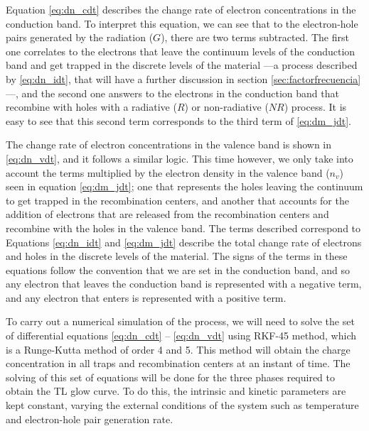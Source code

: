 Equation \ref{eq:dn_cdt} describes the change rate of electron concentrations in the conduction band. To interpret this equation, we can see that to the electron-hole pairs generated by the radiation ($G$), there are two terms subtracted. The first one correlates to the electrons that leave the continuum levels of the conduction band and get trapped in the discrete levels of the material ---a process described by \ref{eq:dn_idt}, that will have a further discussion in section \ref{sec:factorfrecuencia}---, and the second one answers to the electrons in the conduction band that recombine with holes with a radiative ($R$) or non-radiative ($N\!R$) process. It is easy to see that this second term corresponds to the third term of \ref{eq:dm_jdt}. 

\vspace{10pt}
The change rate of electron concentrations in the valence band is shown in \ref{eq:dn_vdt}, and it follows a similar logic. This time however, we only take into account the terms multiplied by the electron density in the valence band ($n_v$) seen in equation \ref{eq:dm_jdt}; one that represents the holes leaving the continuum to get trapped in the recombination centers, and another that accounts for the addition of electrons that are released from the recombination centers and recombine with the holes in the valence band. The terms described correspond to Equations \ref{eq:dn_idt} and \ref{eq:dm_jdt} describe the total change rate of electrons and holes in the discrete levels of the material. The signs of the terms in these equations follow the convention that we are set in the conduction band, and so any electron that leaves the conduction band is represented with a negative term, and any electron that enters is represented with a positive term.

\vspace{10pt}

To carry out a numerical simulation of the process, we will need to solve the set of differential equations \ref{eq:dn_cdt} -- \ref{eq:dn_vdt} using RKF-45 method, which is a Runge-Kutta method of order 4 and 5. This method will obtain the charge concentration in all traps and recombination centers at an instant of time. The solving of this set of equations will be done for the three phases required to obtain the TL glow curve. To do this, the intrinsic and kinetic parameters are kept constant, varying the external conditions of the system such as temperature and electron-hole pair generation rate. 

